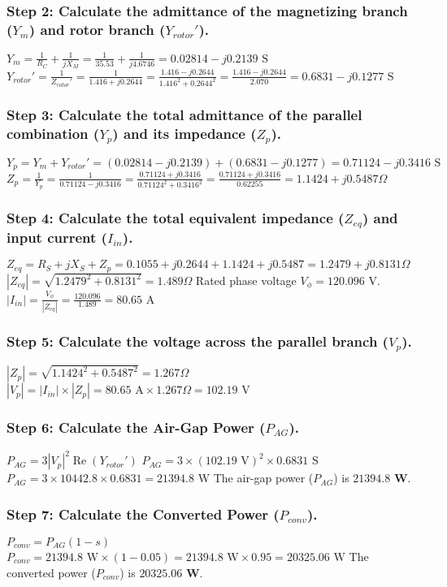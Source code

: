 \documentclass{article}
\begin{document}
	\subsubsection*{Step 2: Calculate the admittance of the magnetizing branch ($Y_m$) and rotor branch ($Y_{rotor}'$).}
	$Y_m = \frac{1}{R_C} + \frac{1}{jX_M} = \frac{1}{35.53} + \frac{1}{j4.6746} = 0.02814 - j0.2139 \text{ S}$
	$Y_{rotor}' = \frac{1}{Z_{rotor}'} = \frac{1}{1.416 + j0.2644} = \frac{1.416 - j0.2644}{1.416^2 + 0.2644^2} = \frac{1.416 - j0.2644}{2.070} = 0.6831 - j0.1277 \text{ S}$
	
	\subsubsection*{Step 3: Calculate the total admittance of the parallel combination ($Y_p$) and its impedance ($Z_p$).}
	$Y_p = Y_m + Y_{rotor}' = (0.02814 - j0.2139) + (0.6831 - j0.1277) = 0.71124 - j0.3416 \text{ S}$
	$Z_p = \frac{1}{Y_p} = \frac{1}{0.71124 - j0.3416} = \frac{0.71124 + j0.3416}{0.71124^2 + 0.3416^2} = \frac{0.71124 + j0.3416}{0.62255} = 1.1424 + j0.5487 \Omega$
	
	\subsubsection*{Step 4: Calculate the total equivalent impedance ($Z_{eq}$) and input current ($I_{in}$).}
	$Z_{eq} = R_S + jX_S + Z_p = 0.1055 + j0.2644 + 1.1424 + j0.5487 = 1.2479 + j0.8131 \Omega$
	$|Z_{eq}| = \sqrt{1.2479^2 + 0.8131^2} = 1.489 \Omega$
	Rated phase voltage $V_{\phi} = 120.096 \text{ V}$.
	$|I_{in}| = \frac{V_{\phi}}{|Z_{eq}|} = \frac{120.096}{1.489} = 80.65 \text{ A}$
	
	\subsubsection*{Step 5: Calculate the voltage across the parallel branch ($V_p$).}
	$|Z_p| = \sqrt{1.1424^2 + 0.5487^2} = 1.267 \Omega$
	$|V_p| = |I_{in}| \times |Z_p| = 80.65 \text{ A} \times 1.267 \Omega = 102.19 \text{ V}$
	
	\subsubsection*{Step 6: Calculate the Air-Gap Power ($P_{AG}$).}
	$P_{AG} = 3 |V_p|^2 \operatorname{Re}(Y_{rotor}')$
	$P_{AG} = 3 \times (102.19 \text{ V})^2 \times 0.6831 \text{ S}$
	$P_{AG} = 3 \times 10442.8 \times 0.6831 = 21394.8 \text{ W}$
	The air-gap power ($P_{AG}$) is $\mathbf{21394.8 \text{ W}}$.
	
	\subsubsection*{Step 7: Calculate the Converted Power ($P_{conv}$).}
	$P_{conv} = P_{AG} (1-s)$
	$P_{conv} = 21394.8 \text{ W} \times (1 - 0.05) = 21394.8 \text{ W} \times 0.95 = 20325.06 \text{ W}$
	The converted power ($P_{conv}$) is $\mathbf{20325.06 \text{ W}}$.
	
\end{document}
